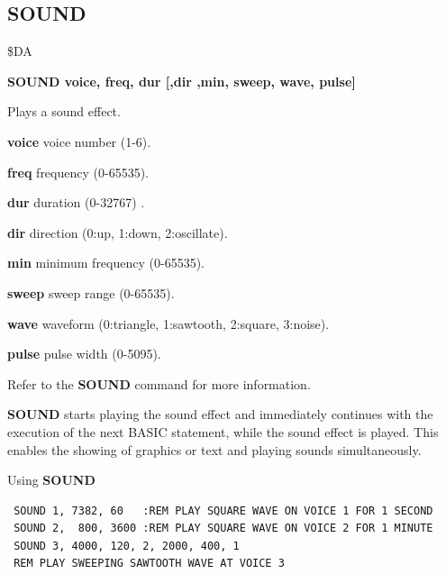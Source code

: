 \subsection{SOUND}
\begin{description}[leftmargin=2cm,style=nextline]
\item [Token:] \$DA
\item [Format:] {\bf SOUND voice, freq, dur
                [,dir ,min, sweep, wave, pulse]}

\item [Usage:] Plays a sound effect.

               {\bf voice} voice number (1-6).

               {\bf freq} frequency (0-65535).

               {\bf dur} duration (0-32767) .

               {\bf dir} direction (0:up, 1:down, 2:oscillate).

               {\bf min} minimum frequency (0-65535).

               {\bf sweep} sweep range (0-65535).

               {\bf wave} waveform (0:triangle, 1:sawtooth, 2:square,
               3:noise).

               {\bf pulse} pulse width (0-5095).

               Refer to the {\bf SOUND} command for more information.

\item [Remarks:] {\bf SOUND} starts playing the sound
               effect and immediately continues with the execution
               of the next BASIC statement, while the sound effect
               is played. This enables the showing of graphics or text
               and playing sounds simultaneously.

\item [Examples:] Using {\bf SOUND}
\begin{tcolorbox}[colback=black,coltext=white]
\verbatimfont{\codefont}
\begin{verbatim}
 SOUND 1, 7382, 60   :REM PLAY SQUARE WAVE ON VOICE 1 FOR 1 SECOND
 SOUND 2,  800, 3600 :REM PLAY SQUARE WAVE ON VOICE 2 FOR 1 MINUTE
 SOUND 3, 4000, 120, 2, 2000, 400, 1
 REM PLAY SWEEPING SAWTOOTH WAVE AT VOICE 3
\end{verbatim}
\end{tcolorbox}
\end{description}

